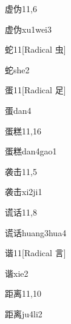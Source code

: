 \begin{entry}{虚伪}{11,6}
  \begin{phonetics}{虚伪}{xu1wei3}
  \end{phonetics}
\end{entry}

\begin{entry}{蛇}{11}[Radical 虫]
  \begin{phonetics}{蛇}{she2}
  \end{phonetics}
\end{entry}

\begin{entry}{蛋}{11}[Radical 足]
  \begin{phonetics}{蛋}{dan4}
  \end{phonetics}
\end{entry}

\begin{entry}{蛋糕}{11,16}
  \begin{phonetics}{蛋糕}{dan4gao1}
  \end{phonetics}
\end{entry}

\begin{entry}{袭击}{11,5}
  \begin{phonetics}{袭击}{xi2ji1}
  \end{phonetics}
\end{entry}

\begin{entry}{谎话}{11,8}
  \begin{phonetics}{谎话}{huang3hua4}
  \end{phonetics}
\end{entry}

\begin{entry}{谐}{11}[Radical 言]
  \begin{phonetics}{谐}{xie2}
  \end{phonetics}
\end{entry}

\begin{entry}{距离}{11,10}
  \begin{phonetics}{距离}{ju4li2}
  \end{phonetics}
\end{entry}

